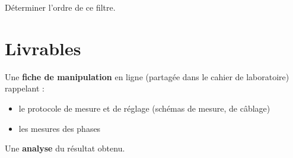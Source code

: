 \Quest Déterminer l'ordre de ce filtre.

\section{Livrables}


Une \textbf{fiche de manipulation} en ligne (partagée dans le cahier de laboratoire) rappelant :

\begin{itemize}
	\item le protocole de mesure et de réglage (schémas de mesure, de câblage)
	\item les mesures des phases
\end{itemize}

Une \textbf{analyse} du résultat obtenu.

